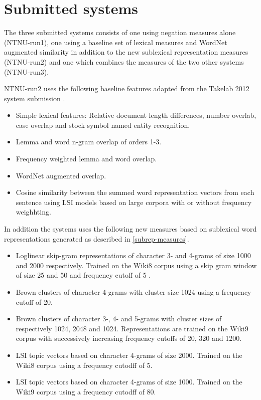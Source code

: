 
\section{Submitted systems}
\label{sec:systems}

The three submitted systems consists of one using negation measures alone (NTNU-run1), one using a baseline set of lexical measures and WordNet augmented similarity in addition to the new sublexical representation measures (NTNU-run2) and one which combines the measures of the two other systems (NTNU-run3).

NTNU-run2 uses the following baseline features adapted from the Takelab 2012 system submission \cite{saric2012takelab}.

\begin{itemize}
\item Simple lexical features: Relative document length differences, number overlab, case overlap and stock symbol named entity recognition.
\item Lemma and word n-gram overlap of orders 1-3.
\item Frequency weighted lemma and word overlap.
\item WordNet augmented overlap.
\item Cosine similarity between the summed word representation vectors from each sentence using LSI models based on large corpora with or without frequency weighhting.
\end{itemize}

In addition the systems uses the following new measures based on sublexical word representations generated as described in \ref{subrep-measures}.

\begin{itemize}
\item Loglinear skip-gram representations of character 3- and 4-grams of size 1000 and 2000 respectively. Trained on the Wiki8 corpus using a skip gram window of size 25 and 50 and frequency cutoff of 5 .
\item Brown clusters of character 4-grams with cluster size 1024 using a frequency cutoff of 20.
\item Brown clusters of character 3-, 4- and 5-grams with cluster sizes of respectively 1024, 2048 and 1024. Representations are trained on the Wiki9 corpus with successively increasing frequency cutoffs of 20, 320 and 1200.
\item LSI topic vectors based on character 4-grams of size 2000.   Trained on the Wiki8 corpus using a frequency cutodff of 5.
\item LSI topic vectors based on character 4-grams of size 1000. Trained on the Wiki9 corpus using a frequency cutodff of 80.
\end{itemize}


